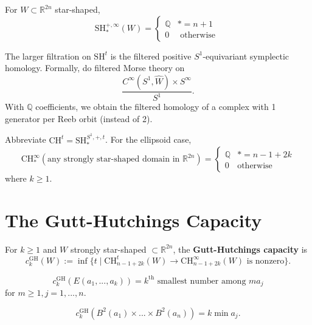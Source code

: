 \begin{example}

For $W\subset \mathbb{R}^{2n}$ star-shaped,
\[
\text{SH}_*^{+,\infty}(W) = \begin{cases} \mathbb{Q} & *=n+1 \\ 0 &\text{ otherwise }\end{cases}
\]

\end{example}

The larger filtration on $\text{SH}^t$ is the filtered positive $S^1$-equivariant symplectic homology. Formally, do filtered Morse theory on 
\[
\dfrac{C^\infty(S^1, \hat{W})\times S^\infty}{S^1}.
\]
With $\mathbb{Q}$ coefficients, we obtain the filtered homology of a complex with 1 generator per Reeb orbit (instead of 2).

\begin{example}

Abbreviate $\text{CH}^t=\text{SH}_*^{S^1, +, t}$. For the ellipsoid case,
\[
\text{CH}_*^\infty(\text{any strongly star-shaped domain in }\mathbb{R}^{2n})=\begin{cases}\mathbb{Q} & *=n-1+2k \\ 0 & \text{otherwise} \end{cases}
\]
where $k\ge 1$.

\end{example}

\section{The Gutt-Hutchings Capacity}

\begin{definition}

For $k\ge 1$ and $W$ strongly star-shaped $\subset \mathbb{R}^{2n}$, the \textbf{Gutt-Hutchings capacity} is
\[
c_k^{\text{GH}}(W) := \inf \{t  \mid  \text{CH}_{n-1+2k}^t(W) \to \text{CH}_{n-1+2k}^\infty(W) \text{ is nonzero}\}.
\]

\end{definition}

\begin{example}

\[
c_k^{\text{GH}}(E(a_1,...,a_k))= k^{\text{th}} \text{ smallest number among } ma_j
\]
for $m\ge 1, j=1,...,n$.

\end{example}

\begin{example}

\[
c_{k}^{\text{GH}}(B^2(a_1)\times ...\times B^2(a_n))= k\min a_j.
\]

\end{example}

